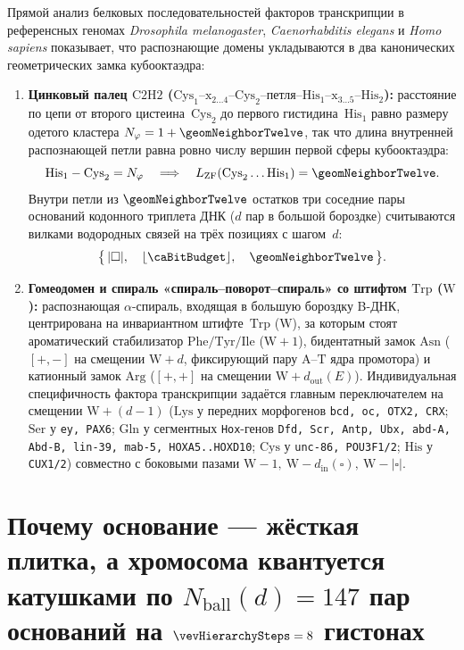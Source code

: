 Прямой анализ белковых последовательностей факторов транскрипции в референсных геномах \emph{Drosophila melanogaster}, \emph{Caenorhabditis elegans} и \emph{Homo sapiens} показывает, что распознающие домены укладываются в два канонических геометрических замка кубооктаэдра:
\begin{enumerate}[leftmargin=*]
\item \textbf{Цинковый палец $\text{C2H2}$ ($\text{Cys}_1\text{--x}_{2\ldots 4}\text{--Cys}_2\text{--петля--His}_1\text{--x}_{3\ldots 5}\text{--His}_2$):}
  расстояние по цепи от второго цистеина~$\text{Cys}_2$ до первого гистидина~$\text{His}_1$ равно размеру одетого кластера $N_\varphi = 1 + \geomNeighborTwelve$, так что длина внутренней распознающей петли равна ровно числу вершин первой сферы кубооктаэдра:
  \[
    \text{His}_1 - \text{Cys}_2 = N_\varphi \quad\Longrightarrow\quad L_{\mathrm{ZF}}(\text{Cys}_2\ldots\text{His}_1) = \geomNeighborTwelve.
  \]
  Внутри петли из $\geomNeighborTwelve$ остатков три соседние пары оснований кодонного триплета ДНК ($d$ пар в большой бороздке) считываются вилками водородных связей на трёх позициях с шагом~$d$:
  \[
    \bigl\{\,|\square|,\quad \lfloor\caBitBudget\rfloor,\quad \geomNeighborTwelve\,\bigr\}.
  \]
\item \textbf{Гомеодомен и спираль «спираль--поворот--спираль» со штифтом $\text{Trp}$ ($\text{W}$):}
  распознающая $\alpha$-спираль, входящая в большую бороздку B-ДНК, центрирована на инвариантном штифте~$\text{Trp}$ ($\text{W}$), за которым стоят ароматический стабилизатор $\text{Phe/Tyr/Ile}$ ($\text{W}+1$), бидентатный замок $\text{Asn}$ ($[+,-]$ на смещении $\text{W}+d$, фиксирующий пару $\text{A--T}$ ядра промотора) и катионный замок $\text{Arg}$ ($[+,+]$ на смещении $\text{W}+d_{\mathrm{out}}(E)$).
  Индивидуальная специфичность фактора транскрипции задаётся главным переключателем на смещении $\text{W}+(d-1)$ ($\text{Lys}$ у передних морфогенов \texttt{bcd, oc, OTX2, CRX}; $\text{Ser}$ у \texttt{ey, PAX6}; $\text{Gln}$ у сегментных \texttt{Hox}-генов \texttt{Dfd, Scr, Antp, Ubx, abd-A, Abd-B, lin-39, mab-5, HOXA5..HOXD10}; $\text{Cys}$ у \texttt{unc-86, POU3F1/2}; $\text{His}$ у \texttt{CUX1/2}) совместно с боковыми пазами $\text{W}-1,\ \text{W}-d_{\mathrm{in}}(\square),\ \text{W}-|\square|$.
\end{enumerate}

\section{Почему основание --- жёсткая плитка, а хромосома квантуется катушками по \texorpdfstring{$N_{\mathrm{ball}}(d)=147$}{N\_ball(d)=147} пар оснований на \texorpdfstring{$\vevHierarchySteps=8$}{N\_hier=8} гистонах}
\label{sec:bio-nucleosome-147}

